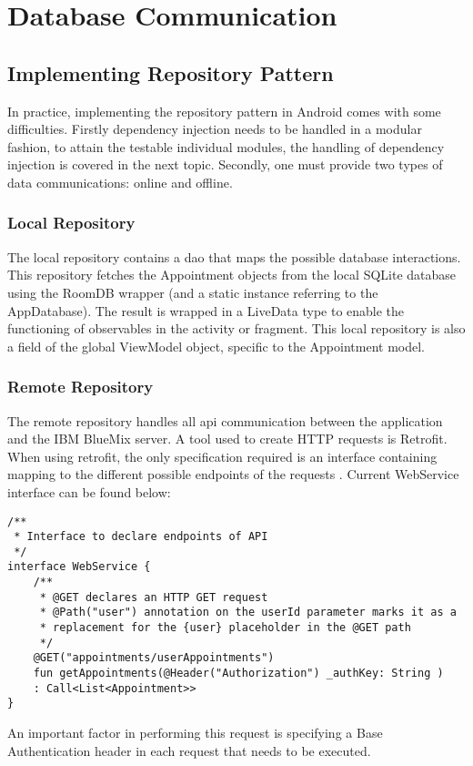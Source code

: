 \section{Database Communication}
\subsection{Implementing Repository Pattern}
In practice, implementing the repository pattern in Android comes with some difficulties. Firstly dependency injection needs to be handled in a modular fashion, to attain the testable individual modules, the handling of dependency injection is covered in the next topic. Secondly, one must provide two types of data communications: online and offline. 
\subsubsection{Local Repository}
The local repository contains a \acrshort{dao} that maps the possible database interactions. This repository fetches the Appointment objects from the local SQLite database using the RoomDB wrapper (and a static instance referring to the AppDatabase). The result is wrapped in a LiveData type to enable the functioning of observables in the activity or fragment. This local repository is also a field of the global ViewModel object, specific to the Appointment model. 
\subsubsection{Remote Repository}
The remote repository handles all \acrshort{api} communication between the application and the IBM BlueMix server. A tool used to create HTTP requests is Retrofit. When using retrofit, the only specification required is an interface containing mapping to the different possible endpoints of the requests \cite{Retrofit}. Current WebService interface can be found below:
\begin{verbatim}
/**
 * Interface to declare endpoints of API
 */
interface WebService {
    /**
     * @GET declares an HTTP GET request
     * @Path("user") annotation on the userId parameter marks it as a
     * replacement for the {user} placeholder in the @GET path
     */
    @GET("appointments/userAppointments")
    fun getAppointments(@Header("Authorization") _authKey: String )
    : Call<List<Appointment>>
}
\end{verbatim}
An important factor in performing this request is specifying a Base Authentication header in each request that needs to be executed.
